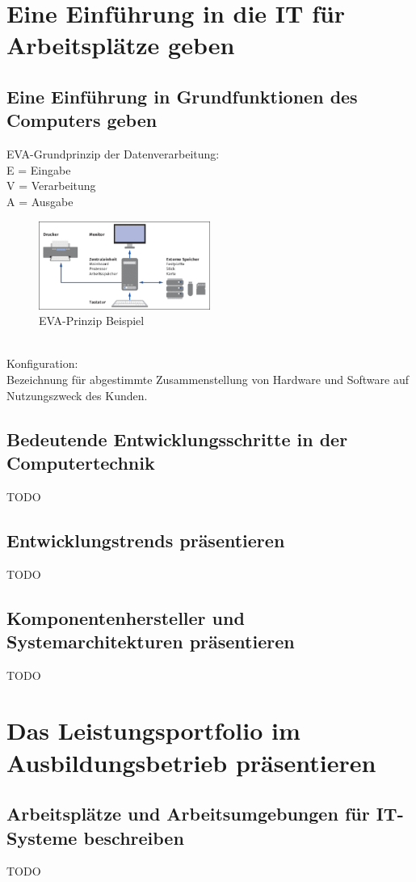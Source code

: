 \documentclass[11pt]{article}
\begin{document}
\section{Eine Einführung in die IT für Arbeitsplätze geben}
\subsection{Eine Einführung in Grundfunktionen des Computers geben}
    EVA-Grundprinzip der Datenverarbeitung:\\
    E = Eingabe\\
    V = Verarbeitung\\
    A = Ausgabe
    \begin{figure}[h]
        \centering
        \includegraphics[width=0.5\textwidth]{./images/2.1.1_konfiguration.png}
        \caption{EVA-Prinzip Beispiel}
        \label{fig:EVA-Prinzip}
    \end{figure}\\
    Konfiguration:\\
    Bezeichnung für abgestimmte Zusammenstellung von Hardware und Software auf Nutzungszweck des Kunden.
\subsection{Bedeutende Entwicklungsschritte in der Computertechnik}
    TODO
\subsection{Entwicklungstrends präsentieren}
    TODO
\subsection{Komponentenhersteller und Systemarchitekturen präsentieren}
    TODO

\newpage
\section{Das Leistungsportfolio im Ausbildungsbetrieb präsentieren}
\subsection{Arbeitsplätze und Arbeitsumgebungen für IT-Systeme beschreiben}
    TODO
\end{document}
